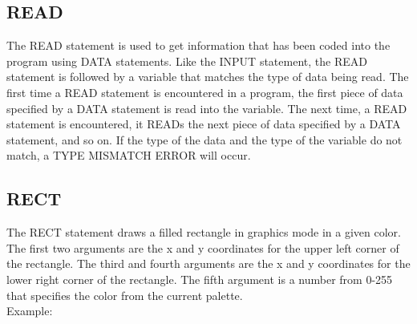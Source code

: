 \subsection{READ}

The {\ttfamily READ} statement is used to get information that has been coded
into the program using {\ttfamily DATA} statements.  Like the {\ttfamily INPUT}
statement, the {\ttfamily READ} statement is followed by a variable that
matches the type of data being read.  The first time a {\ttfamily READ}
statement is encountered in a program, the first piece of data specified by a
{\ttfamily DATA} statement is read into the variable.  The next time, a
{\ttfamily READ} statement is encountered, it {\ttfamily READ}s the next piece
of data specified by a {\ttfamily DATA} statement, and so on.  If the type of
the data and the type of the variable do not match, a {\ttfamily TYPE MISMATCH
ERROR} will occur.\\


\subsection{RECT}

The {\ttfamily RECT} statement draws a filled rectangle in graphics mode in a
given color.  The first two arguments are the x and y coordinates for the upper
left corner of the rectangle.  The third and fourth arguments are the x and y
coordinates for the lower right corner of the rectangle.  The fifth argument is
a number from 0-255 that specifies the color from the current palette.\\

Example:\\


